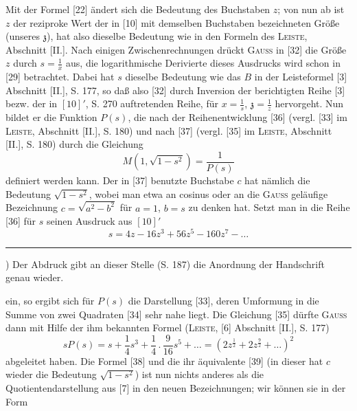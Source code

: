 \par\indent Mit der Formel [22] ändert sich die Bedeutung des Buchstaben $z$; von nun ab ist $z$ der reziproke Wert der in [10] mit demselben Buchstaben bezeichneten Größe (unseres $\mathfrak z$), hat also dieselbe Bedeutung wie in den Formeln des \textsc{Leiste}, Abschnitt [II.]. Nach einigen Zwischenrechnungen drückt \textsc{Gauss} in [32] die Größe $z$ durch $s=\frac1x$ aus, die logarithmische Derivierte dieses Ausdrucks wird schon in [29] betrachtet. Dabei hat $s$ dieselbe Bedeutung wie das $B$ in der Leisteformel [3] Abschnitt [II.], S. 177, so daß also [32] durch Inversion der berichtigten Reihe [3] bezw. der in $[10]'$, S. 270 auftretenden Reihe, für $x=\frac1s$, $\mathfrak z=\frac1z$ hervorgeht. Nun bildet er die Funktion $P(s)$, die nach der Reihenentwicklung [36] (vergl. [33] im \textsc{Leiste}, Abschnitt [II.], S. 180) und nach [37] (vergl. [35] im \textsc{Leiste}, Abschnitt [II.], S. 180) durch die Gleichung
\begin{equation*}\tag*{$[37]'$}M(1,\sqrt{1-s^2})=\frac1{P(s)}\end{equation*}
\noindent definiert werden kann. Der in [37] benutzte Buchstabe $c$ hat nämlich die Bedeutung $\sqrt{1-s^2}$, wobei man etwa an cosinus oder an die \textsc{Gauss} geläufige Bezeichnung $c=\sqrt{a^2-b^2}$ für $a=1$, $b=s$ zu denken hat. Setzt man in die Reihe [36] für $s$ seinen Ausdruck aus $[10]'$
\begin{equation*}\tag*{$[10]''$}s=4z-16z^3+56z^5-160z^7-\ldots\end{equation*}
\par\smallskip\noindent\rule{.25\linewidth}{.4pt}\par
{\small\par\indent *) Der Abdruck gibt an dieser Stelle (S. 187) die Anordnung der Handschrift genau wieder.\par}
\clearpage
{}
\noindent ein, so ergibt sich für $P(s)$ die Darstellung [33], deren Umformung in die Summe von zwei Quadraten [34] sehr nahe liegt. Die Gleichung [35] dürfte \textsc{Gauss} dann mit Hilfe der ihm bekannten Formel (\textsc{Leiste}, [6] Abschnitt [II.], S. 177)
\begin{equation*}\tag*{$[6]'$}sP(s)=s+\frac14s^3+\frac14\,.\,\frac9{16}s^5+\ldots=(2z^{\frac12}+2z^{\frac92}+\ldots)^2\end{equation*}
\noindent abgeleitet haben. Die Formel [38] und die ihr äquivalente [39] (in dieser hat $c$ wieder die Bedeutung $\sqrt{1-s^2}$) ist nun nichts anderes als die Quotientendarstellung aus [7] in den neuen Bezeichnungen; wir können sie in der Form
